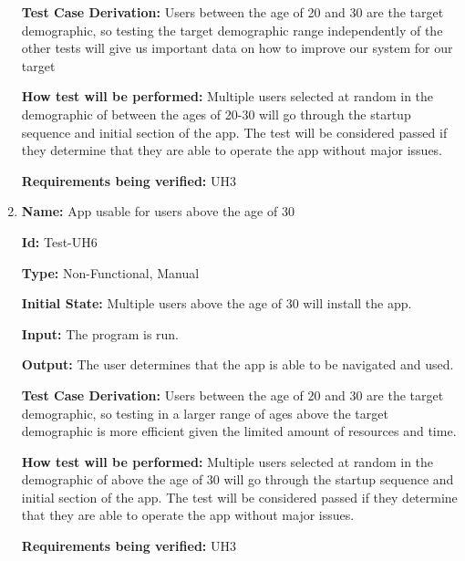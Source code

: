 \documentclass[12pt, titlepage]{article}
\begin{document}
\begin{enumerate}
\textbf{Test Case Derivation:} Users between the age of 20 and 30 are the target demographic, so testing the target demographic range independently of the other tests will give us important data on how to improve our system for our target 
					
\textbf{How test will be performed:} Multiple users selected at random in the demographic of between the ages of 20-30 will go through the startup sequence and initial section of the app. The test will be considered passed if they determine that they are able to operate the app without major issues. 

\textbf{Requirements being verified:} UH3

\item{\textbf{Name:} App usable for users above the age of 30} \label{itm:Test-UH6}

\textbf{Id:} Test-UH6

\textbf{Type:} Non-Functional, Manual
					
\textbf{Initial State:} Multiple users above the age of 30 will install the app.
					
\textbf{Input:} The program is run.
					
\textbf{Output:} The user determines that the app is able to be navigated and used.

\textbf{Test Case Derivation:} Users between the age of 20 and 30 are the target demographic, so testing in a larger range of ages above the target demographic is more efficient given the limited amount of resources and time.
					
\textbf{How test will be performed:} Multiple users selected at random in the demographic of above the age of 30 will go through the startup sequence and initial section of the app. The test will be considered passed if they determine that they are able to operate the app without major issues. 

\textbf{Requirements being verified:} UH3



					
					
					

\end{enumerate}
\end{document}
